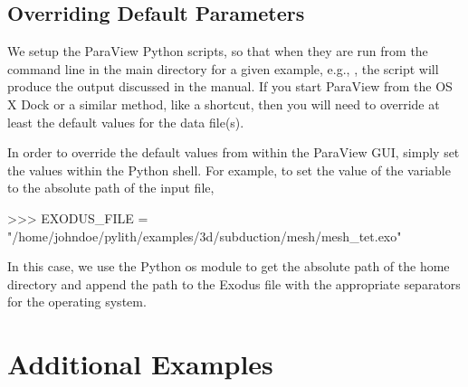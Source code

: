 
\subsection{Overriding Default Parameters}

We setup the ParaView Python scripts, so that when they are run from
the command line in the main directory for a given example, e.g.,
, the script will produce the output
discussed in the manual. If you start ParaView from the OS X Dock or a
similar method, like a shortcut, then you will need to override at
least the default values for the data file(s).

In order to override the default values from within the ParaView GUI,
simply set the values within the Python shell. For example, to set the
value of the variable  to the absolute path of
the input file,
\begin{python}
>>> EXODUS_FILE = "/home/johndoe/pylith/examples/3d/subduction/mesh/mesh_tet.exo"
\end{python}
In this case, we use the Python os module to get the absolute path of
the home directory and append the path to the Exodus file with the
appropriate separators for the operating system.

















\section{Additional Examples}


